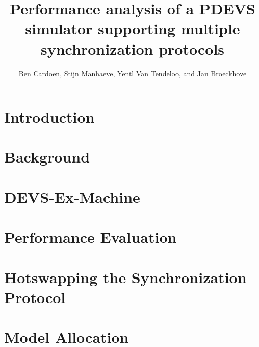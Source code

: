 \documentclass{sagej}
\begin{document}
\title{Performance analysis of a PDEVS simulator supporting multiple synchronization protocols}

\author{Ben Cardoen, Stijn Manhaeve, Yentl Van Tendeloo, and Jan Broeckhove}




\begin{abstract}

\end{abstract}

\maketitle

\section{Introduction}
\label{sec:1-introduction}


\section{Background}
\label{sec:2-background}


\section{DEVS-Ex-Machine}
\label{sec:3-features}


\section{Performance Evaluation}
\label{sec:4-performance}


\section{Hotswapping the Synchronization Protocol}
\label{sec:4b-hotswap}


\section{Model Allocation}
\label{sec:4a-allocation}

\end{document}

